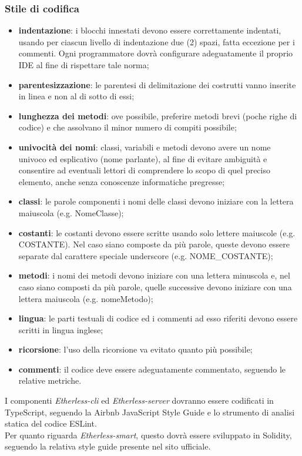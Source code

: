     	\subsubsection*{Stile di codifica}
   \begin{itemize}
         \item{\textbf{indentazione}: i blocchi innestati devono essere correttamente indentati, usando per ciascun livello di indentazione due (2) spazi, fatta eccezione per i commenti. Ogni programmatore dovrà configurare adeguatamente il proprio IDE al fine di rispettare tale norma;}
		\item{\textbf{parentesizzazione}: le parentesi di delimitazione dei costrutti vanno inserite in linea e non al di sotto di essi;}
		\item{\textbf{lunghezza dei metodi}: ove possibile, preferire metodi brevi (poche righe di codice) e che assolvano il minor numero di compiti possibile;}
		\item{\textbf{univocità dei nomi}: classi, variabili e metodi devono avere un nome univoco ed esplicativo (nome parlante), al fine di evitare ambiguità e consentire ad eventuali lettori di comprendere lo scopo di quel preciso elemento, anche senza conoscenze informatiche pregresse;}
		\item{\textbf{classi}: le parole componenti i nomi delle classi devono iniziare con la lettera maiuscola (e.g. NomeClasse);}
		\item{\textbf{costanti}: le costanti devono essere scritte usando solo lettere maiuscole (e.g. COSTANTE). Nel caso siano composte da più parole, queste devono essere separate dal carattere speciale underscore (e.g. NOME\_COSTANTE);}
		\item{\textbf{metodi}: i nomi dei metodi devono iniziare con una lettera minuscola e, nel caso 	siano composti da più parole, quelle successive devono iniziare con una lettera maiuscola (e.g. nomeMetodo);}
		\item{\textbf{lingua}: le parti testuali di codice ed i commenti ad esso riferiti devono essere scritti in lingua inglese;}
        \item{\textbf{ricorsione}: l'uso della ricorsione va evitato quanto più possibile;}
        \item{\textbf{commenti}: il codice deve essere adeguatamente commentato, seguendo le relative metriche.}
	\end{itemize}

	\noindent I componenti \textit{Etherless-cli} ed \textit{Etherless-server} dovranno essere codificati in TypeScript, seguendo la Airbnb JavaScript Style Guide e lo strumento di analisi statica del codice ESLint. \\
	Per quanto riguarda \textit{Etherless-smart}, questo dovrà essere sviluppato in Solidity, seguendo la relativa style guide presente nel sito ufficiale.

